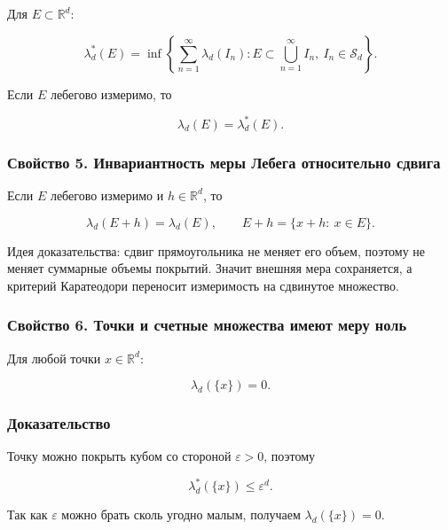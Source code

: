 \documentclass[
  11pt,
  a4paper,
]{article}
\begin{document}
Для \(E\subset\mathbb R^d\):

\[
\lambda_d^*(E)
=
\inf\left\{
\sum_{n=1}^{\infty}\lambda_d(I_n):
E\subset\bigcup_{n=1}^{\infty}I_n,\ I_n\in\mathcal S_d
\right\}.
\]

Если \(E\) лебегово измеримо, то

\[
\lambda_d(E)=\lambda_d^*(E).
\]

\subsubsection{Свойство 5. Инвариантность меры Лебега относительно
сдвига}\label{ux441ux432ux43eux439ux441ux442ux432ux43e-5.-ux438ux43dux432ux430ux440ux438ux430ux43dux442ux43dux43eux441ux442ux44c-ux43cux435ux440ux44b-ux43bux435ux431ux435ux433ux430-ux43eux442ux43dux43eux441ux438ux442ux435ux43bux44cux43dux43e-ux441ux434ux432ux438ux433ux430}

Если \(E\) лебегово измеримо и \(h\in\mathbb R^d\), то

\[
\lambda_d(E+h)=\lambda_d(E),
\qquad
E+h=\{x+h:\ x\in E\}.
\]

Идея доказательства: сдвиг прямоугольника не меняет его объем, поэтому
не меняет суммарные объемы покрытий. Значит внешняя мера сохраняется, а
критерий Каратеодори переносит измеримость на сдвинутое множество.

\subsubsection{Свойство 6. Точки и счетные множества имеют меру
ноль}\label{ux441ux432ux43eux439ux441ux442ux432ux43e-6.-ux442ux43eux447ux43aux438-ux438-ux441ux447ux435ux442ux43dux44bux435-ux43cux43dux43eux436ux435ux441ux442ux432ux430-ux438ux43cux435ux44eux442-ux43cux435ux440ux443-ux43dux43eux43bux44c}

Для любой точки \(x\in\mathbb R^d\):

\[
\lambda_d(\{x\})=0.
\]

\subsubsection{Доказательство}\label{ux434ux43eux43aux430ux437ux430ux442ux435ux43bux44cux441ux442ux432ux43e-1}

Точку можно покрыть кубом со стороной \(\varepsilon>0\), поэтому

\[
\lambda_d^*(\{x\})\le\varepsilon^d.
\]

Так как \(\varepsilon\) можно брать сколь угодно малым, получаем
\(\lambda_d(\{x\})=0\).
\end{document}

